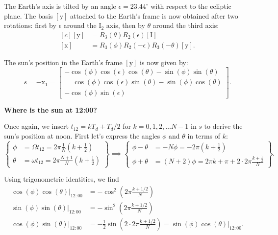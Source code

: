 \documentclass[12pt]{article}
\begin{document}
The Earth's axis is tilted by an angle $\epsilon=23.44^\circ$ with respect to
the ecliptic plane. The basis $[\mathrm{y}]$ attached to the Earth's frame is 
now obtained after two rotations: first by $\epsilon$ around the $\mathrm{I}_2$ 
axis, then by $\theta$ around the third axis:
\begin{equation}
    \begin{aligned}[c]
        [ \mathrm{y} ] &= R_3(\theta) R_2(\epsilon) [\mathrm{I}] \\
        [ \mathrm{x} ] &= R_3(\phi) R_2(-\epsilon) R_3(-\theta)[\mathrm{y}].
    \end{aligned}
\end{equation}

The sun's position in the Earth's frame $[\mathrm{y}]$ is now given by:
\begin{equation}
    s = -\mathrm{x}_1 =
    \begin{bmatrix}
        -\cos(\phi)\cos(\epsilon)\cos(\theta) - \sin(\phi)\sin(\theta)\\
        \phantom{+}\cos(\phi)\cos(\epsilon)\sin(\theta)-\sin(\phi) \cos(\theta)\\
        -\cos(\phi)\sin(\epsilon)\phantom{\sin(\theta)+\sin(\phi) \cos(\theta)}
    \end{bmatrix}.
\end{equation}

\textbf{Where is the sun at 12:00?}

Once again, we insert $t_{12}=kT_d+T_d/2$ for $k=0,1,2,\ldots N-1$ in $s$ to 
derive the sun's position at noon. First let's express the angles $\phi$ and 
$\theta$ in terms of $k$:
\begin{equation}
    \left\{
    \begin{aligned}
        \phi &= \Omega t_{12} = 2\pi \frac{1}{N} (k+\tfrac{1}{2})\\
        \theta &= \omega t_{12} = 2\pi \frac{N+1}{N} (k+\tfrac{1}{2})
    \end{aligned}
    \right\} \implies
    \left\{
    \begin{aligned}
        \phi-\theta &= -N\phi = -2\pi (k+\tfrac{1}{2})\\
        \phi+\theta &= (N+2)\phi = 2\pi k + \pi + 2\cdot 2\pi \frac{k+\tfrac{1}{2}}{N}
    \end{aligned}
    \right\}.
\end{equation}

Using trigonometric identities, we find
\begin{equation}
    \begin{aligned}
        \cos(\phi)\cos(\theta)\vert_{12:00} &= -\cos^2\left(2\pi \frac{k+1/2}{N}\right)\\
        \sin(\phi)\sin(\theta)\vert_{12:00} &= -\sin^2\left(2\pi \frac{k+1/2}{N}\right)\\
        \cos(\phi)\sin(\theta)\vert_{12:00} &= -\frac{1}{2} \sin(2\cdot 2\pi \frac{k+1/2}{N})
        = \sin(\phi)\cos(\theta)\vert_{12:00}.
    \end{aligned}
\end{equation}
\end{document}

